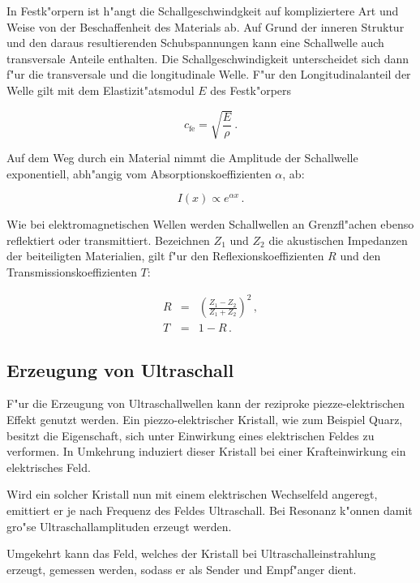 		In Festk"orpern ist h"angt die Schallgeschwindgkeit auf kompliziertere Art und Weise von der Beschaffenheit des Materials ab.
		Auf Grund der inneren Struktur und den daraus resultierenden Schubspannungen kann eine Schallwelle auch transversale Anteile enthalten.
		Die Schallgeschwindigkeit unterscheidet sich dann f"ur die transversale und die longitudinale Welle.
		F"ur den Longitudinalanteil der Welle gilt mit dem Elastizit"atsmodul $E$ des Festk"orpers

		\begin{equation}
			c_\mathrm{fe} = \sqrt{\frac{E}{\rho}} \,.
		\end{equation}

		
		\clearpage
		Auf dem Weg durch ein Material nimmt die Amplitude der Schallwelle exponentiell, abh"angig vom Absorptionskoeffizienten $\alpha$, ab:

		\begin{equation}
			I(x) \propto e^{\alpha x} \,.
		\end{equation}

		Wie bei elektromagnetischen Wellen werden Schallwellen an Grenzfl"achen ebenso reflektiert oder transmittiert.
		Bezeichnen $Z_1$ und $Z_2$ die akustischen Impedanzen der beiteiligten Materialien, gilt f"ur den Reflexionskoeffizienten $R$ und den Transmissionskoeffizienten $T$:

		\begin{eqnarray}
			R & = & \left(\frac{Z_1 - Z_2}{Z_1 + Z_2}\right)^2 \,, \\
			T & = & 1 - R \,.
		\end{eqnarray}

	\subsection{Erzeugung von Ultraschall}
	\label{subsec:erzeugung}
		F"ur die Erzeugung von Ultraschallwellen kann der reziproke piezze-elektrischen Effekt genutzt werden.
		Ein piezzo-elektrischer Kristall, wie zum Beispiel Quarz, besitzt die Eigenschaft, sich unter Einwirkung eines elektrischen Feldes zu verformen.
		In Umkehrung induziert dieser Kristall bei einer Krafteinwirkung ein elektrisches Feld.

		Wird ein solcher Kristall nun mit einem elektrischen Wechselfeld angeregt, emittiert er je nach Frequenz des Feldes Ultraschall.
		Bei Resonanz k"onnen damit gro"se Ultraschallamplituden erzeugt werden.

		Umgekehrt kann das Feld, welches der Kristall bei Ultraschalleinstrahlung erzeugt, gemessen werden, sodass er als Sender und Empf"anger dient. \\

